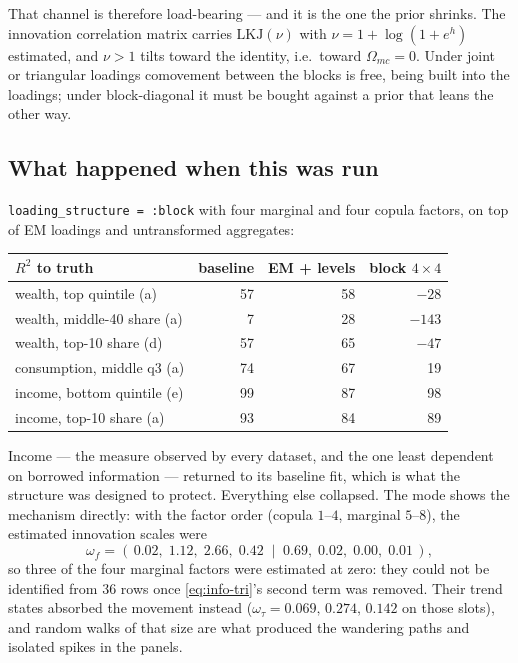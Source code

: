 \documentclass[11pt]{article}
\newcommand{\code}[1]{\texttt{#1}}
\begin{document}
That channel is therefore load-bearing --- and it is the one the prior shrinks.
The innovation correlation matrix carries
$\mathrm{LKJ}(\nu)$ with $\nu = 1 + \log(1+e^{h})$ estimated, and $\nu > 1$
tilts toward the identity, i.e.\ toward $\Omega_{mc} = 0$. Under joint or
triangular loadings comovement between the blocks is free, being built into the
loadings; under block-diagonal it must be bought against a prior that leans the
other way.

\subsection{What happened when this was run}

\code{loading\_structure = :block} with four marginal and four copula factors,
on top of EM loadings and untransformed aggregates:

\begin{center}
\begin{tabular}{lrrr}
\toprule
$R^2$ to truth & baseline & EM + levels & block $4\times4$ \\
\midrule
wealth, top quintile (a)      & 57 & 58 & $-28$ \\
wealth, middle-40 share (a)   &  7 & 28 & $-143$ \\
wealth, top-10 share (d)      & 57 & 65 & $-47$ \\
consumption, middle q3 (a)    & 74 & 67 & 19 \\
income, bottom quintile (e)   & 99 & 87 & 98 \\
income, top-10 share (a)      & 93 & 84 & 89 \\
\bottomrule
\end{tabular}
\end{center}

Income --- the measure observed by every dataset, and the one least dependent on
borrowed information --- returned to its baseline fit, which is what the
structure was designed to protect. Everything else collapsed. The mode shows the
mechanism directly: with the factor order (copula $1$--$4$, marginal $5$--$8$),
the estimated innovation scales were
\begin{equation}
  \omega_f = (\,0.02,\; 1.12,\; 2.66,\; 0.42 \;\mid\; 0.69,\; 0.02,\; 0.00,\; 0.01\,),
\end{equation}
so three of the four marginal factors were estimated at zero: they could not be
identified from $36$ rows once \eqref{eq:info-tri}'s second term was removed.
Their trend states absorbed the movement instead
($\omega_\tau = 0.069,\,0.274,\,0.142$ on those slots), and random walks of that
size are what produced the wandering paths and isolated spikes in the panels.
\end{document}
